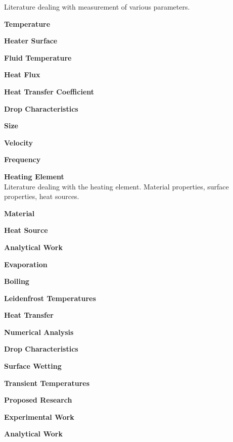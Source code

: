 \documentclass{report}
\begin{document}
\begin{outline}
\begin{outline}
\begin{outline}
  Literature dealing with measurement of various parameters.
      \begin{outline}
  \item {\bf Temperature }
        \begin{outline}
          \item {\bf Heater Surface }
    \item {\bf Fluid Temperature }
    \item {\bf Heat Flux }
    \item {\bf Heat Transfer Coefficient }
        \end{outline}
  \item {\bf Drop Characteristics }
  \begin{outline}
    \item {\bf Size }
    \item {\bf Velocity }
    \item {\bf Frequency }
        \end{outline}
      \end{outline}
      \item {\bf Heating Element } \\
  Literature dealing with the heating element.  Material
  properties, surface properties, heat sources.
      \begin{outline}
  \item {\bf Material }
  \item {\bf Heat Source }
      \end{outline}
    \end{outline}
    \item {\bf Analytical Work }
    \begin{outline}
      \item {\bf Evaporation }
      \item {\bf Boiling }
      \item {\bf Leidenfrost Temperatures }
      \item {\bf Heat Transfer }
      \item {\bf Numerical Analysis }
      \begin{outline}
  \item {\bf Drop Characteristics }
  \item {\bf Surface Wetting }
  \item {\bf Transient Temperatures }
      \end{outline}
    \end{outline}
  \end{outline}
  \item {\bf Proposed Research }
  \begin{outline}
    \item {\bf Experimental Work }
    \item {\bf Analytical Work }
  \end{outline}
\end{outline}
\end{document}
